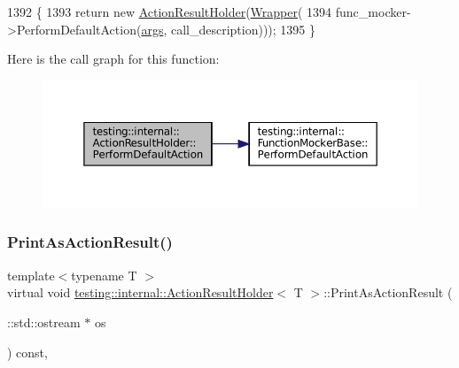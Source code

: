 \begin{DoxyCode}
1392                                       \{
1393     \textcolor{keywordflow}{return} \textcolor{keyword}{new} \hyperlink{classtesting_1_1internal_1_1ActionResultHolder_abd600b0ffabe799853682d791cb24c77}{ActionResultHolder}(\hyperlink{classtesting_1_1internal_1_1ActionResultHolder_aa483b488570efd86657857501dce2b1d}{Wrapper}(
1394         func\_mocker->PerformDefaultAction(\hyperlink{namespacegenerate__debs_a75f9143e38df82d83b2e8a6f99cae02c}{args}, call\_description)));
1395   \}
\end{DoxyCode}
Here is the call graph for this function\+:
\nopagebreak
\begin{figure}[H]
\begin{center}
\leavevmode
\includegraphics[width=350pt]{classtesting_1_1internal_1_1ActionResultHolder_a9609dcb5fb16271f83d777b087075272_cgraph}
\end{center}
\end{figure}
\mbox{\label{classtesting_1_1internal_1_1ActionResultHolder_a06d1fb40fc863328dbcc102bc46dece4}} 
\subsubsection{\texorpdfstring{Print\+As\+Action\+Result()}{PrintAsActionResult()}}
{\footnotesize\ttfamily template$<$typename T $>$ \\
virtual void \hyperlink{classtesting_1_1internal_1_1ActionResultHolder}{testing\+::internal\+::\+Action\+Result\+Holder}$<$ T $>$\+::Print\+As\+Action\+Result (\begin{DoxyParamCaption}\item[{\+::std\+::ostream $\ast$}]{os }\end{DoxyParamCaption}) const\hspace{0.3cm}{\ttfamily [inline]}, {\ttfamily [virtual]}}




